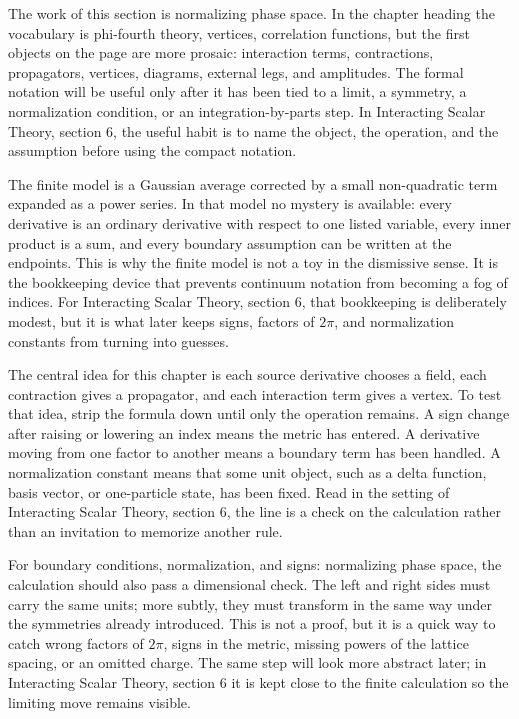 The work of this section is normalizing phase space.  In the chapter heading the vocabulary is phi-fourth theory, vertices, correlation functions, but the first objects on the page are more prosaic: interaction terms, contractions, propagators, vertices, diagrams, external legs, and amplitudes.  The formal notation will be useful only after it has been tied to a limit, a symmetry, a normalization condition, or an integration-by-parts step.  In Interacting Scalar Theory, section 6, the useful habit is to name the object, the operation, and the assumption before using the compact notation.

The finite model is a Gaussian average corrected by a small non-quadratic term expanded as a power series.  In that model no mystery is available: every derivative is an ordinary derivative with respect to one listed variable, every inner product is a sum, and every boundary assumption can be written at the endpoints.  This is why the finite model is not a toy in the dismissive sense.  It is the bookkeeping device that prevents continuum notation from becoming a fog of indices.  For Interacting Scalar Theory, section 6, that bookkeeping is deliberately modest, but it is what later keeps signs, factors of \(2\pi\), and normalization constants from turning into guesses.

The central idea for this chapter is each source derivative chooses a field, each contraction gives a propagator, and each interaction term gives a vertex.  To test that idea, strip the formula down until only the operation remains.  A sign change after raising or lowering an index means the metric has entered.  A derivative moving from one factor to another means a boundary term has been handled.  A normalization constant means that some unit object, such as a delta function, basis vector, or one-particle state, has been fixed.  Read in the setting of Interacting Scalar Theory, section 6, the line is a check on the calculation rather than an invitation to memorize another rule.

For boundary conditions, normalization, and signs: normalizing phase space, the calculation should also pass a dimensional check.  The left and right sides must carry the same units; more subtly, they must transform in the same way under the symmetries already introduced.  This is not a proof, but it is a quick way to catch wrong factors of \(2\pi\), signs in the metric, missing powers of the lattice spacing, or an omitted charge.  The same step will look more abstract later; in Interacting Scalar Theory, section 6 it is kept close to the finite calculation so the limiting move remains visible.


